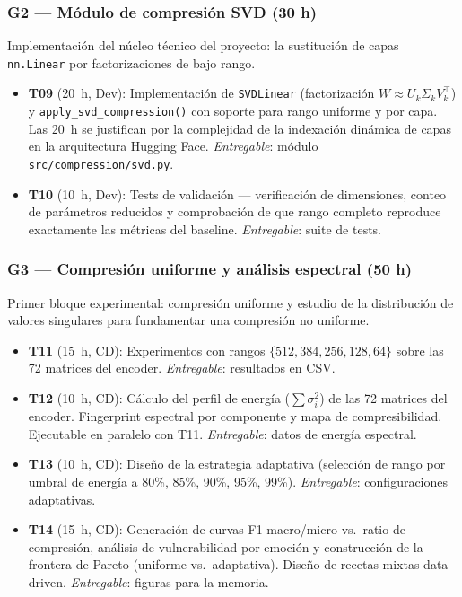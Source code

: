 \documentclass[11pt, a4paper]{article}
\begin{document}
\subsubsection{G2 --- Módulo de compresión SVD (30 h)}

Implementación del núcleo técnico del proyecto: la sustitución de capas \texttt{nn.Linear} por factorizaciones de bajo rango.

\begin{itemize}[nosep, leftmargin=1.2em, itemsep=2pt]
    \item \textbf{T09} (20~h, Dev): Implementación de \texttt{SVDLinear} (factorización $W \approx U_k \Sigma_k V_k^\top$) y \texttt{apply\_svd\_compression()} con soporte para rango uniforme y por capa. Las 20~h se justifican por la complejidad de la indexación dinámica de capas en la arquitectura Hugging Face. \textit{Entregable}: módulo \texttt{src/compression/svd.py}.
    \item \textbf{T10} (10~h, Dev): Tests de validación --- verificación de dimensiones, conteo de parámetros reducidos y comprobación de que rango completo reproduce exactamente las métricas del baseline. \textit{Entregable}: suite de tests.
\end{itemize}

\subsubsection{G3 --- Compresión uniforme y análisis espectral (50 h)}

Primer bloque experimental: compresión uniforme y estudio de la distribución de valores singulares para fundamentar una compresión no uniforme.

\begin{itemize}[nosep, leftmargin=1.2em, itemsep=2pt]
    \item \textbf{T11} (15~h, CD): Experimentos con rangos $\{512, 384, 256, 128, 64\}$ sobre las 72 matrices del encoder. \textit{Entregable}: resultados en CSV.
    \item \textbf{T12} (10~h, CD): Cálculo del perfil de energía ($\sum \sigma_i^2$) de las 72 matrices del encoder. Fingerprint espectral por componente y mapa de compresibilidad. Ejecutable en paralelo con T11. \textit{Entregable}: datos de energía espectral.
    \item \textbf{T13} (10~h, CD): Diseño de la estrategia adaptativa (selección de rango por umbral de energía a 80\%, 85\%, 90\%, 95\%, 99\%). \textit{Entregable}: configuraciones adaptativas.
    \item \textbf{T14} (15~h, CD): Generación de curvas F1 macro/micro vs.\ ratio de compresión, análisis de vulnerabilidad por emoción y construcción de la frontera de Pareto (uniforme vs.\ adaptativa). Diseño de recetas mixtas data-driven. \textit{Entregable}: figuras para la memoria.
\end{itemize}
\end{document}
